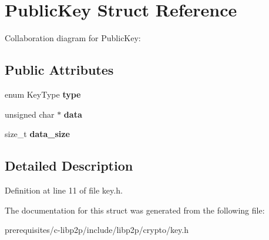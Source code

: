 \hypertarget{struct_public_key}{}\section{Public\+Key Struct Reference}
\label{struct_public_key}


Collaboration diagram for Public\+Key\+:
\subsection*{Public Attributes}
\begin{DoxyCompactItemize}
\item 
\mbox{\label{struct_public_key_a37f40fe1dad52e5b3ffa8d02691fe384}} 
enum Key\+Type {\bfseries type}
\item 
\mbox{\label{struct_public_key_adb5002c3daa56b9f811b7c4cc9f6fee0}} 
unsigned char $\ast$ {\bfseries data}
\item 
\mbox{\label{struct_public_key_a2a9230bd6da4c7fc7ce63c7bbde1a488}} 
size\+\_\+t {\bfseries data\+\_\+size}
\end{DoxyCompactItemize}


\subsection{Detailed Description}


Definition at line 11 of file key.\+h.



The documentation for this struct was generated from the following file\+:\begin{DoxyCompactItemize}
\item 
prerequisites/c-\/libp2p/include/libp2p/crypto/key.\+h\end{DoxyCompactItemize}
